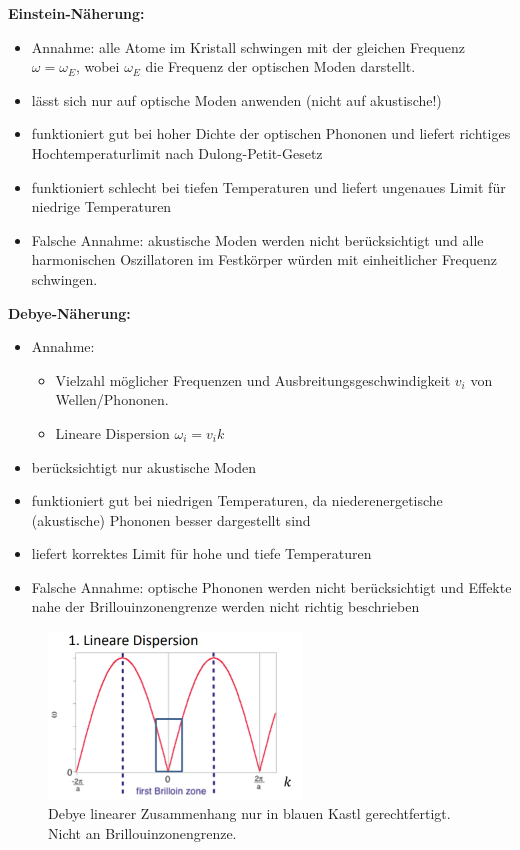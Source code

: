 \label{q:39}

\label{q:40}

\textbf{Einstein-Näherung:} 
\begin{itemize}
    \item Annahme: alle Atome im Kristall schwingen mit der gleichen Frequenz $\omega = \omega_E$, wobei $\omega_E$ die Frequenz der optischen Moden darstellt. 
    \item lässt sich nur auf optische Moden anwenden (nicht auf akustische!)
    \item funktioniert gut bei hoher Dichte der optischen Phononen und liefert richtiges 
    Hochtemperaturlimit nach Dulong-Petit-Gesetz
    \item funktioniert schlecht bei tiefen Temperaturen und liefert ungenaues Limit für niedrige Temperaturen
    \item Falsche Annahme: akustische Moden werden nicht berücksichtigt und alle harmonischen Oszillatoren im Festkörper würden mit einheitlicher Frequenz schwingen.
\end{itemize}

\textbf{Debye-Näherung:} 
\begin{itemize}
    \item Annahme: 
        \begin{itemize}
            \item Vielzahl möglicher Frequenzen und Ausbreitungsgeschwindigkeit $v_i$ von Wellen/Phononen. 
            \item Lineare Dispersion $\omega_i=v_ik$ 
        \end{itemize}
    \item berücksichtigt nur akustische Moden
    \item funktioniert gut bei niedrigen Temperaturen, da niederenergetische (akustische) Phononen besser dargestellt sind 
    \item liefert korrektes Limit für hohe und tiefe Temperaturen
    \item Falsche Annahme: optische Phononen werden nicht berücksichtigt und Effekte nahe der Brillouinzonengrenze werden nicht richtig beschrieben
\end{itemize}

\begin{figure}[H]
    \centering
    \includegraphics[width=0.6\textwidth]{resources/15-06-2015/debye_dispersion.png}
    \caption{Debye linearer Zusammenhang nur in blauen Kastl gerechtfertigt. Nicht an Brillouinzonengrenze.}
   \end{figure}

